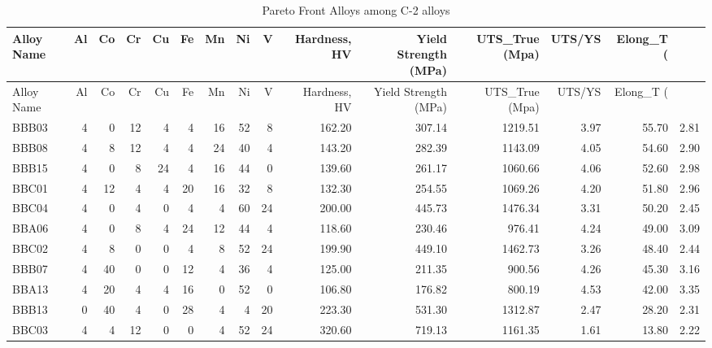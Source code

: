 \begin{longtable}{lrrrrrrrrrrrrrr}
\caption{Pareto Front Alloys among C-2 alloys} \label{tab:pareto_combined} \\
\toprule
Alloy Name & Al & Co & Cr & Cu & Fe & Mn & Ni & V & Hardness, HV & Yield Strength (MPa) & UTS_True (Mpa) & UTS/YS & Elong_T (%
\midrule
\endfirsthead
\caption[]{Pareto Front Alloys among C-2 alloys} \\
\toprule
Alloy Name & Al & Co & Cr & Cu & Fe & Mn & Ni & V & Hardness, HV & Yield Strength (MPa) & UTS_True (Mpa) & UTS/YS & Elong_T (%
\midrule
\endhead
\midrule
\multicolumn{15}{r}{Continued on next page} \\
\midrule
\endfoot
\bottomrule
\endlastfoot
BBB03 & 4 & 0 & 12 & 4 & 4 & 16 & 52 & 8 & 162.20 & 307.14 & 1219.51 & 3.97 & 55.70 & 2.81 \\
BBB08 & 4 & 8 & 12 & 4 & 4 & 24 & 40 & 4 & 143.20 & 282.39 & 1143.09 & 4.05 & 54.60 & 2.90 \\
BBB15 & 4 & 0 & 8 & 24 & 4 & 16 & 44 & 0 & 139.60 & 261.17 & 1060.66 & 4.06 & 52.60 & 2.98 \\
BBC01 & 4 & 12 & 4 & 4 & 20 & 16 & 32 & 8 & 132.30 & 254.55 & 1069.26 & 4.20 & 51.80 & 2.96 \\
BBC04 & 4 & 0 & 4 & 0 & 4 & 4 & 60 & 24 & 200.00 & 445.73 & 1476.34 & 3.31 & 50.20 & 2.45 \\
BBA06 & 4 & 0 & 8 & 4 & 24 & 12 & 44 & 4 & 118.60 & 230.46 & 976.41 & 4.24 & 49.00 & 3.09 \\
BBC02 & 4 & 8 & 0 & 0 & 4 & 8 & 52 & 24 & 199.90 & 449.10 & 1462.73 & 3.26 & 48.40 & 2.44 \\
BBB07 & 4 & 40 & 0 & 0 & 12 & 4 & 36 & 4 & 125.00 & 211.35 & 900.56 & 4.26 & 45.30 & 3.16 \\
BBA13 & 4 & 20 & 4 & 4 & 16 & 0 & 52 & 0 & 106.80 & 176.82 & 800.19 & 4.53 & 42.00 & 3.35 \\
BBB13 & 0 & 40 & 4 & 0 & 28 & 4 & 4 & 20 & 223.30 & 531.30 & 1312.87 & 2.47 & 28.20 & 2.31 \\
BBC03 & 4 & 4 & 12 & 0 & 0 & 4 & 52 & 24 & 320.60 & 719.13 & 1161.35 & 1.61 & 13.80 & 2.22 \\
\end{longtable}

